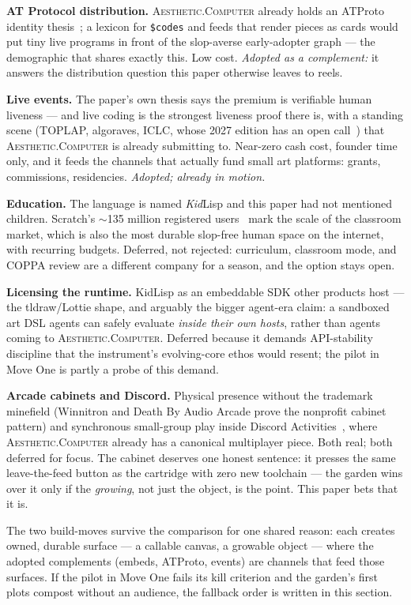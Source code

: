 \documentclass[10pt,letterpaper,twocolumn]{article}
\newcommand{\ac}{\textsc{Aesthetic.Computer}}
\begin{document}
\textbf{AT Protocol distribution.} \ac{} already holds an ATProto identity thesis~\citep{scudder2026ac}; a lexicon for \texttt{\$codes} and feeds that render pieces as cards would put tiny live programs in front of the slop-averse early-adopter graph --- the demographic that shares exactly this. Low cost. \emph{Adopted as a complement:} it answers the distribution question this paper otherwise leaves to reels.

\textbf{Live events.} The paper's own thesis says the premium is verifiable human liveness --- and live coding is the strongest liveness proof there is, with a standing scene (TOPLAP, algoraves, ICLC, whose 2027 edition has an open call~\citep{iclc2027}) that \ac{} is already submitting to. Near-zero cash cost, founder time only, and it feeds the channels that actually fund small art platforms: grants, commissions, residencies. \emph{Adopted; already in motion.}

\textbf{Education.} The language is named \emph{Kid}Lisp and this paper had not mentioned children. Scratch's $\sim$135 million registered users~\citep{scratch2026stats} mark the scale of the classroom market, which is also the most durable slop-free human space on the internet, with recurring budgets. Deferred, not rejected: curriculum, classroom mode, and COPPA review are a different company for a season, and the option stays open.

\textbf{Licensing the runtime.} KidLisp as an embeddable SDK other products host --- the tldraw/Lottie shape, and arguably the bigger agent-era claim: a sandboxed art DSL agents can safely evaluate \emph{inside their own hosts}, rather than agents coming to \ac{}. Deferred because it demands API-stability discipline that the instrument's evolving-core ethos would resent; the pilot in Move One is partly a probe of this demand.

\textbf{Arcade cabinets and Discord.} Physical presence without the trademark minefield (Winnitron and Death By Audio Arcade prove the nonprofit cabinet pattern) and synchronous small-group play inside Discord Activities~\citep{discord2024activities}, where \ac{} already has a canonical multiplayer piece. Both real; both deferred for focus. The cabinet deserves one honest sentence: it presses the same leave-the-feed button as the cartridge with zero new toolchain --- the garden wins over it only if the \emph{growing}, not just the object, is the point. This paper bets that it is.

The two build-moves survive the comparison for one shared reason: each creates owned, durable surface --- a callable canvas, a growable object --- where the adopted complements (embeds, ATProto, events) are channels that feed those surfaces. If the pilot in Move One fails its kill criterion and the garden's first plots compost without an audience, the fallback order is written in this section.
\end{document}
